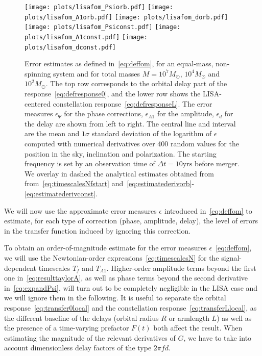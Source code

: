 \documentclass[aps,showpacs,twocolumn,
prd,superscriptaddress,nofootinbib]{revtex4-1}
\newcommand{\Msol}{M_{\odot}}
\newcommand{\Tf}{T_{f}}
\begin{document}
\begin{figure}
  \centering
  \texttt{[image: plots/lisafom\_Psiorb.pdf]}
  \texttt{[image: plots/lisafom\_A1orb.pdf]}
  \texttt{[image: plots/lisafom\_dorb.pdf]}
  \texttt{[image: plots/lisafom\_Psiconst.pdf]}
  \texttt{[image: plots/lisafom\_A1const.pdf]}
  \texttt{[image: plots/lisafom\_dconst.pdf]}
  \caption{Error estimates as defined in~\eqref{eq:deffom}, for an equal-mass, non-spinning system and for total masses $M=10^{7} \Msol$, $10^{4} \Msol$ and $10^{2} \Msol$. The top row corresponds to the orbital delay part of the response~\eqref{eq:defresponse0}, and the lower row shows the LISA-centered constellation response~\eqref{eq:defresponseL}. The error measures $\epsilon_{\Psi}$ for the phase corrections, $\epsilon_{A1}$ for the amplitude, $\epsilon_{d}$ for the delay are shown from left to right. The central line and interval are the mean and $1\sigma$ standard deviation of the logarithm of $\epsilon$ computed with numerical derivatives over 400 random values for the position in the sky, inclination and polarization. The starting frequency is set by an observation time of $\Delta t = 10 \text{yrs}$ before merger. We overlay in dashed the analytical estimates obtained from from~\eqref{eq:timescalesNfstart} and~\eqref{eq:estimatederivorb}-\eqref{eq:estimatederivconst}.}
  \label{fig:fomLISA}
\end{figure}

We will now use the approximate error measures $\epsilon$ introduced in~\eqref{eq:deffom} to estimate, for each type of correction (phase, amplitude, delay), the level of errors in the transfer function induced by ignoring this correction.

To obtain an order-of-magnitude estimate for the error measures $\epsilon$~\eqref{eq:deffom}, we will use the Newtonian-order expressions~\eqref{eq:timescalesN} for the signal-dependent timescales $\Tf$ and $T_{A1}$. Higher-order amplitude terms beyond the first one in~\eqref{eq:resulttaylorA}, as well as phase terms beyond the second derivative in~\eqref{eq:expandPsi}, will turn out to be completely negligible in the LISA case and we will ignore them in the following. It is useful to separate the orbital response~\eqref{eq:transfer0local} and the constellation response~\eqref{eq:transferLlocal}, as the different baseline of the delays (orbital radius $R$ or armlength $L$) as well as the presence of a time-varying prefactor $F(t)$ both affect the result. When estimating the magnitude of the relevant derivatives of $G$, we have to take into account dimensionless delay factors of the type $2\pi f d$.
\end{document}
